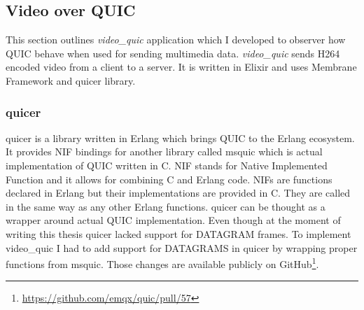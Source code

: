 \clearpage

\subsection{Video over QUIC}
\label{subsec:video}
This section outlines \textit{video\_quic} application which I developed to observer how QUIC behave when used for
sending multimedia data.
\textit{video\_quic} sends H264 encoded video from a client to a server.
It is written in Elixir and uses Membrane Framework and quicer library.

\subsubsection{quicer}
quicer is a library written in Erlang which brings QUIC to the Erlang ecosystem.
It provides NIF bindings for another library called msquic which is actual implementation of QUIC written in C\@.
NIF stands for Native Implemented Function and it allows for combining C and Erlang code.
NIFs are functions declared in Erlang but their implementations are provided in C\@.
They are called in the same way as any other Erlang functions.
quicer can be thought as a wrapper around actual QUIC implementation.
Even though at the moment of writing this thesis quicer lacked support for DATAGRAM frames.
To implement video\_quic I had to add support for DATAGRAMS in quicer by wrapping proper functions from msquic.
Those changes are available publicly on GitHub\footnote{\url{https://github.com/emqx/quic/pull/57}}.

